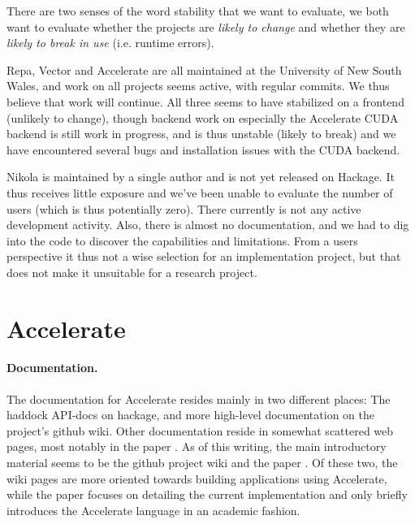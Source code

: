 There are two senses of the word stability that we want to evaluate,
we both want to evaluate whether the projects are \emph{likely to
  change} and whether they are \emph{likely to break in use}
(i.e. runtime errors).

Repa, Vector and Accelerate are all maintained at the University of
New South Wales, and work on all projects seems active, with regular
commits. We thus believe that work will continue. All three seems to
have stabilized on a frontend (unlikely to change), though backend
work on especially the Accelerate CUDA backend is still work in
progress, and is thus unstable (likely to break) and we have
encountered several bugs and installation issues with the CUDA
backend.

Nikola is maintained by a single author and is not yet released on
Hackage. It thus receives little exposure and we've been unable to
evaluate the number of users (which is thus potentially zero). There
currently is not any active development activity. Also, there is almost
no documentation, and we had to dig into the code to discover the
capabilities and limitations. From a users perspective it thus not a
wise selection for an implementation project, but that does not make
it unsuitable for a research project.








\section{Accelerate}
\paragraph{Documentation.} The documentation for Accelerate resides mainly in
two different places: The haddock API-docs on hackage, and more high-level
documentation on the project's github wiki.  Other documentation reside in
somewhat scattered web pages, most notably in the paper
\cite{chakravarty2011accelerating}.  As of this writing, the main introductory
material seems to be the github project wiki and the paper
\cite{chakravarty2011accelerating}. Of these two, the wiki pages are more
oriented towards building applications using Accelerate, while the paper
focuses on detailing the current implementation and only briefly introduces the
Accelerate language in an academic fashion.

